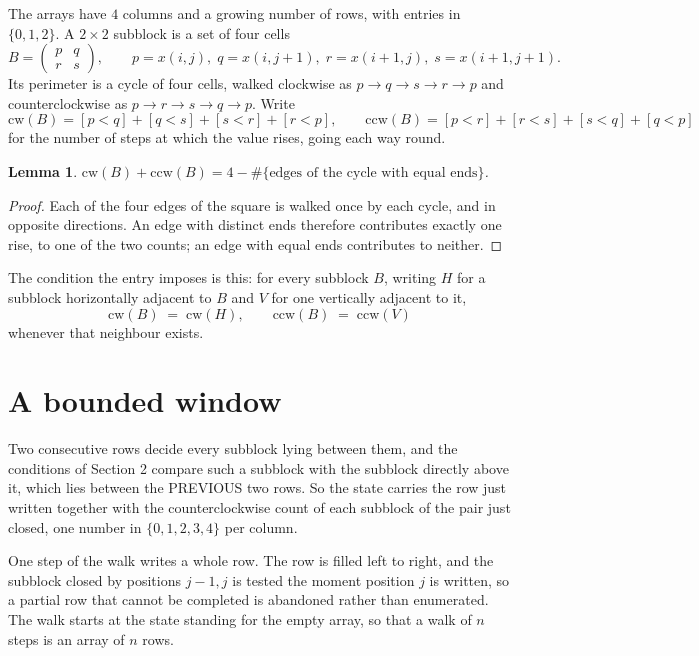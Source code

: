 \documentclass[11pt,a4paper]{article}
\theoremstyle{plain}
\newtheorem{lemma}[theorem]{Lemma}
\theoremstyle{definition}
\begin{document}
The arrays have $4$ columns and a growing number of rows, with entries in $\{0,1,2\}$. A
$2\times2$ subblock is a set of four cells
\[
B=\begin{pmatrix} p & q \\ r & s \end{pmatrix},
\qquad p=x(i,j),\; q=x(i,j+1),\; r=x(i+1,j),\; s=x(i+1,j+1).
\]
Its perimeter is a cycle of four cells, walked clockwise as $p\to q\to s\to r\to p$ and
counterclockwise as $p\to r\to s\to q\to p$. Write
\[
\mathrm{cw}(B)=[p<q]+[q<s]+[s<r]+[r<p],\qquad
\mathrm{ccw}(B)=[p<r]+[r<s]+[s<q]+[q<p]
\]
for the number of steps at which the value rises, going each way round.

\begin{lemma}\label{lem:sum}
$\mathrm{cw}(B)+\mathrm{ccw}(B)=4-\#\{\text{edges of the cycle with equal ends}\}$.
\end{lemma}

\begin{proof}
Each of the four edges of the square is walked once by each cycle, and in opposite directions.
An edge with distinct ends therefore contributes exactly one rise, to one of the two counts;
an edge with equal ends contributes to neither.
\end{proof}

The condition the entry imposes is this: for every subblock $B$, writing $H$ for a subblock horizontally adjacent to $B$ and $V$ for one vertically adjacent to it,
\[
\mathrm{cw}(B)\;=\;\mathrm{cw}(H),\qquad \mathrm{ccw}(B)\;=\;\mathrm{ccw}(V)
\]
whenever that neighbour exists.

\section{A bounded window}

Two consecutive rows decide every subblock lying between them, and the conditions of Section 2 compare such a subblock with the subblock directly above it, which lies between the PREVIOUS two rows. So the state carries the row just written together with the counterclockwise count of each subblock of the pair just closed, one number in $\{0,1,2,3,4\}$ per column.

One step of the walk writes a whole row. The row is filled left to right, and the subblock
closed by positions $j-1,j$ is tested the moment position $j$ is written, so a partial row that
cannot be completed is abandoned rather than enumerated. The walk starts at the state standing
for the empty array, so that a walk of $n$ steps is an array of $n$ rows.
\end{document}
